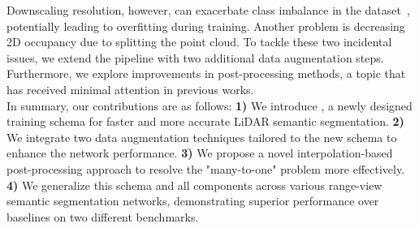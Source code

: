Downscaling resolution, however, can exacerbate class imbalance in the dataset~\cite{cortinhal2020salsanext}, potentially leading to overfitting during training. Another problem is decreasing 2D occupancy due to splitting the point cloud. To tackle these two incidental issues, we extend the pipeline with two additional data augmentation steps. Furthermore, we explore improvements in post-processing methods, a topic that has received minimal attention in previous works. \\
In summary, our contributions are as follows: \textbf{1)} We introduce \coolname{}, a newly designed training schema for faster and more accurate LiDAR semantic segmentation. \textbf{2)} We integrate two data augmentation techniques tailored to the new schema to enhance the network performance. \textbf{3)} We propose a novel interpolation-based post-processing approach to resolve the "many-to-one" problem more effectively. \textbf{4)} We generalize this schema and all components across various range-view semantic segmentation networks, demonstrating superior performance over baselines on two different benchmarks.
 







